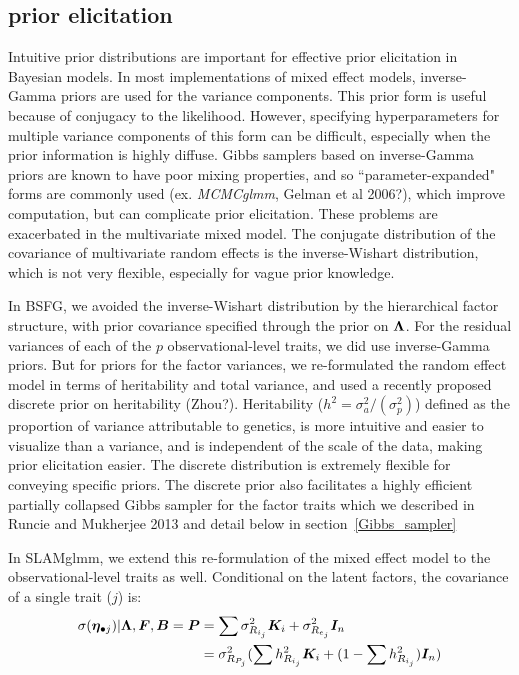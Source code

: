 \documentclass[11pt]{amsart}
\newcommand*{\B}[1]{\ifmmode\bm{#1}\else\textbf{#1}\fi}
\begin{document}
\subsection{prior elicitation}
\label{random_effect_priors}
Intuitive prior distributions are important for effective prior elicitation in Bayesian models. In most implementations of mixed effect models, inverse-Gamma priors are used for the variance components. This prior form is useful because of conjugacy to the likelihood. However, specifying hyperparameters for multiple variance components of this form can be difficult, especially when the prior information is highly diffuse. Gibbs samplers based on inverse-Gamma priors are known to have poor mixing properties, and so ``parameter-expanded" forms are commonly used (ex. \emph{MCMCglmm}, Gelman et al 2006?), which improve computation, but can complicate prior elicitation. These problems are exacerbated in the multivariate mixed model. The conjugate distribution of the covariance of multivariate random effects is the inverse-Wishart distribution, which is not very flexible, especially for vague prior knowledge.

In BSFG, we avoided the inverse-Wishart distribution by the hierarchical factor structure, with prior covariance specified through the prior on $\B{\Lambda}$. For the residual variances of each of the $p$ observational-level traits, we did use inverse-Gamma priors. But for priors for the factor variances, we re-formulated the random effect model in terms of heritability and total variance, and used a recently proposed discrete prior on heritability (Zhou?). Heritability ($h^2 = \sigma^2_a / (\sigma^2_p)$) defined as the proportion of variance attributable to genetics, is more intuitive and easier to visualize than a variance, and is independent of the scale of the data, making prior elicitation easier. The discrete distribution is extremely flexible for conveying specific priors. The discrete prior also facilitates a highly efficient partially collapsed Gibbs sampler for the factor traits which we described in Runcie and Mukherjee 2013 and detail below in section~\ref{Gibbs_sampler}


In SLAMglmm, we extend this re-formulation of the mixed effect model to the observational-level traits as well. Conditional on the latent factors, the covariance of a single trait ($j$) is:
\begin{align} \begin{split}
\sigma(\B{\eta}_{\bullet j}) | \B{\Lambda}, \B{F}, \B{B} = \B{P} &= \sum \sigma^2_{R_{i_j}} \B{K}_i + \sigma^2_{R_{e_j}}\B{I}_n \\
&= \sigma^2_{R_{P_j}} (\sum h^2_{R_{i_j}} \B{K}_i + (1 - \sum h^2_{R_{i_j}})\B{I}_n) 
\end{split} \end{align}
\end{document}
